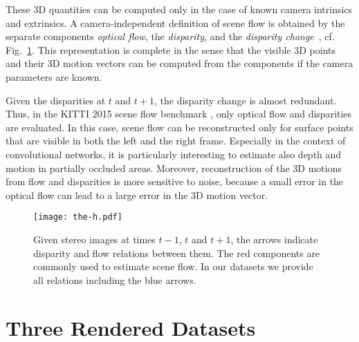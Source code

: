 \documentclass[10pt,twocolumn,letterpaper]{article}
\begin{document}
These 3D quantities can be computed only in the case of known camera intrinsics and extrinsics.
A camera-independent definition of scene flow is obtained by the separate components \emph{optical flow}, the \emph{disparity}, and the \emph{disparity change}~\cite{HD07}, cf. Fig.~\ref{fig:the-h}.
This representation is complete in the sense that the visible 3D points and their 3D motion vectors can be computed from the components if the camera parameters are known. 

Given the disparities at $t$ and $t\!+\!1$, the disparity change is almost redundant.
Thus, in the KITTI 2015 scene flow benchmark \cite{Menze2015CVPR}, only optical flow and disparities are evaluated.
In this case, scene flow can be reconstructed only for surface points that are visible in both the left and the right frame. 
Especially in the context of convolutional networks, it is particularly interesting to estimate also depth and motion in partially occluded areas. 
Moreover, reconstruction of the 3D motions from flow and disparities is more sensitive to noise, because a small error in the optical flow can lead to a large error in the 3D motion vector.






\begin{figure}[t]
\begin{center}
   \texttt{[image: the-h.pdf]}
\end{center}
   \caption{Given stereo images at times $t\!-\!1$, $t$ and $t\!+\!1$, the arrows indicate disparity and flow relations between them. The red components are commonly used to estimate scene flow. In our datasets we provide all relations including the blue arrows.}
\label{fig:the-h}
\end{figure}



\section{Three Rendered Datasets}\label{sec:datasets}








\label{sec:our_datasets}
\end{document}
